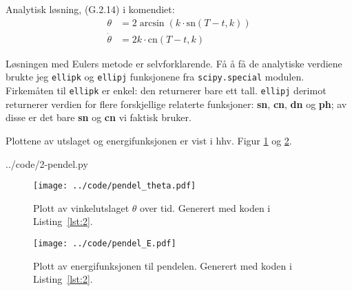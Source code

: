 \noindent Analytisk løsning, (G.2.14) i komendiet:
\begin{subequations}
\begin{align}
  \theta     &= 2 \arcsin \left( k\cdot \mathrm{sn}(T-t,k) \right) \\
  \dot\theta &= 2 k \cdot \mathrm{cn}(T-t,k)
\end{align}
\end{subequations}

Løsningen med Eulers metode er selvforklarende. Få å få de analytiske verdiene brukte jeg \texttt{ellipk} og \texttt{ellipj} funksjonene fra \texttt{scipy.special} modulen. Firkemåten til \texttt{ellipk} er enkel: den returnerer bare ett tall. \texttt{ellipj} derimot returnerer verdien for flere forskjellige relaterte funksjoner: \textbf{sn}, \textbf{cn}, \textbf{dn} og \textbf{ph}; av disse er det bare \textbf{sn} og \textbf{cn} vi faktisk bruker.

Plottene av utslaget og energifunksjonen er vist i hhv. Figur \ref{fig:2_theta} og \ref{fig:2_E}.


  {../code/2-pendel.py}

\begin{figure}[H]
  \centering
  \texttt{[image: ../code/pendel\_theta.pdf]}
  \caption{Plott av vinkelutslaget $\theta$ over tid. Generert med koden i Listing~\ref{lst:2}.}
  \label{fig:2_theta}
\end{figure}

\begin{figure}[H]
  \centering
  \texttt{[image: ../code/pendel\_E.pdf]}
  \caption{Plott av energifunksjonen til pendelen. Generert med koden i Listing~\ref{lst:2}.}
  \label{fig:2_E}
\end{figure}





